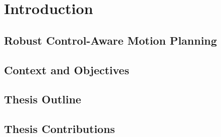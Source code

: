 \chapter{Introduction}

\section{Robust Control-Aware Motion Planning}

\section{Context and Objectives}

\section{Thesis Outline}

\section{Thesis Contributions}

\todomarker{}